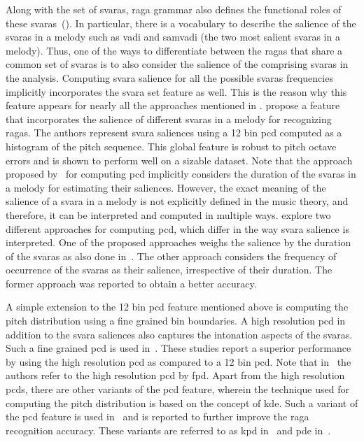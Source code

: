Along with the set of \glspl{svara}, \gls{raga} grammar also defines the functional roles of these \glspl{svara}~(). In particular, there is a vocabulary to describe the salience of the \glspl{svara} in a melody such as \gls{vadi} and \gls{samvadi} (the two most salient \glspl{svara} in a melody). Thus, one of the ways to differentiate between the \glspl{raga} that share a common set of \glspl{svara} is to also consider the salience of the comprising \glspl{svara} in the analysis. Computing \gls{svara} salience for all the possible \glspl{svara} frequencies implicitly incorporates the \gls{svara} set feature as well. This is the reason why this feature appears for nearly all the approaches mentioned in . \cite{chordia2007raag} propose a feature that incorporates the salience of different \glspl{svara} in a melody for recognizing \glspl{raga}. The authors represent \gls{svara} saliences using a 12 bin \gls{pcd} computed as a histogram of the pitch sequence. This global feature is robust to pitch octave errors and is shown to perform well on a sizable dataset. Note that the approach proposed by~\cite{chordia2007raag} for computing \gls{pcd} implicitly considers the duration of the \glspl{svara} in a melody for estimating their saliences. However, the exact meaning of the salience of a \gls{svara} in a melody is not explicitly defined in the music theory, and therefore, it can be interpreted and computed in multiple ways. \cite{koduri2011survey} explore two different approaches for computing \gls{pcd}, which differ in the way \gls{svara} salience is interpreted. One of the proposed approaches weighs the salience by the duration of the \glspl{svara} as also done in~\cite{chordia2007raag}. The other approach considers the frequency of occurrence of the \glspl{svara} as their salience, irrespective of their duration. The former approach was reported to obtain a better accuracy.

A simple extension to the 12 bin \gls{pcd} feature mentioned above is computing the pitch distribution using a fine grained bin boundaries. A high resolution \gls{pcd} in addition to the \gls{svara} saliences also captures the intonation aspects of the \glspl{svara}. Such a fine grained \gls{pcd} is used in~\cite{chordia2013joint,koduri2012raga,belle2009raga,kumar2014identifying}. These studies report a superior performance by using the high resolution \gls{pcd} as compared to a 12 bin \gls{pcd}. Note that in~\cite{chordia2013joint} the authors refer to the high resolution \gls{pcd} by \gls{fpd}. Apart from the high resolution \glspl{pcd}, there are other variants of the \gls{pcd} feature, wherein the technique used for computing the pitch distribution is based on the concept of \gls{kde}. Such a variant of the \gls{pcd} feature is used in~\cite{chordia2013joint,ranjani2011carnatic} and is reported to further improve the \gls{raga} recognition accuracy. These variants are referred to as \gls{kpd} in~\cite{chordia2013joint} and \gls{pde} in~\cite{ranjani2011carnatic}. 

